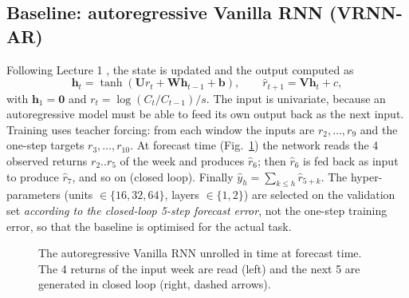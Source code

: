 \documentclass[11pt,a4paper]{article}
\newcommand{\yhat}{\hat{y}}
\begin{document}
\subsection{Baseline: autoregressive Vanilla RNN (VRNN-AR)}
Following Lecture 1 \cite{elman1990,goodfellow2016}, the state is updated and the output computed as
\begin{equation}
  \mathbf h_t=\tanh(\mathbf U r_t+\mathbf W\mathbf h_{t-1}+\mathbf b),\qquad \hat r_{t+1}=\mathbf V\mathbf h_t+c,
\end{equation}
with $\mathbf h_1=\mathbf 0$ and $r_t=\log(C_t/C_{t-1})/s$. The input is univariate, because an autoregressive model must be able to feed its own output back as the next input. Training uses teacher forcing: from each window the inputs are $r_2,\dots,r_9$ and the one-step targets $r_3,\dots,r_{10}$. At forecast time (Fig.~\ref{fig:vrnn}) the network reads the 4 observed returns $r_2..r_5$ of the week and produces $\hat r_6$; then $\hat r_6$ is fed back as input to produce $\hat r_7$, and so on (closed loop). Finally $\yhat_h=\sum_{k\le h}\hat r_{5+k}$. The hyper-parameters (units $\in\{16,32,64\}$, layers $\in\{1,2\}$) are selected on the validation set \emph{according to the closed-loop 5-step forecast error}, not the one-step training error, so that the baseline is optimised for the actual task.

\begin{figure}[tbp]
  \centering
  \resizebox{0.95\linewidth}{!}{\unskip}
  \caption{The autoregressive Vanilla RNN unrolled in time at forecast time. The 4 returns of the input week are read (left) and the next 5 are generated in closed loop (right, dashed arrows).}
  \label{fig:vrnn}
\end{figure}
\end{document}
